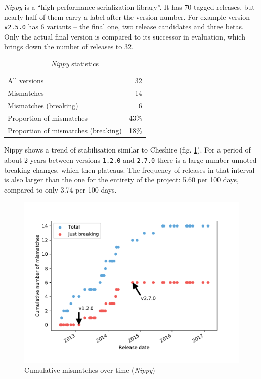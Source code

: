 \documentclass{l4proj}
\newcommand\genericstyle{\lstset{basicstyle=\ttm}}
\newcommand\codeinline[1]{{\genericstyle\lstinline!#1!}}
\begin{document}
\textit{Nippy} \cite{Nippy} is a ``high-performance serialization
library''. It has 70 tagged releases, but nearly half of them carry a
label after the version number. For example version
\codeinline{v2.5.0} has 6 variants -- the final one, two release
candidates and three betas. Only the actual final version is compared
to its successor in evaluation, which brings down the number of
releases to 32.

\begin{table}
\centering
\caption{\textit{Nippy} statistics}
\label{NippyStats}
\begin{tabular}{|lr|}
All versions & 32 \\
Mismatches & 14 \\
Mismatches (breaking) & 6 \\
Proportion of mismatches & 43\% \\
Proportion of mismatches (breaking) & 18\% \\
\end{tabular}
\end{table}

Nippy shows a trend of stabilisation similar to
Cheshire (fig. \ref{NippyCumulativeMismatches}). For a period
of about 2 years between versions \codeinline{1.2.0} and
\codeinline{2.7.0} there is a large number unnoted breaking changes,
which then plateaus. The frequency of releases in that interval is
also larger than the one for the entirety of the project: 5.60 per 100
days, compared to only 3.74 per 100 days.

\begin{figure}[]
\centering
\includegraphics[height=0.4\textheight]
{images/evaluation/nippy_cumulative_mismatches}
\caption{Cumulative mismatches over time (\textit{Nippy})}
\label{NippyCumulativeMismatches}
\end{figure}
\end{document}
